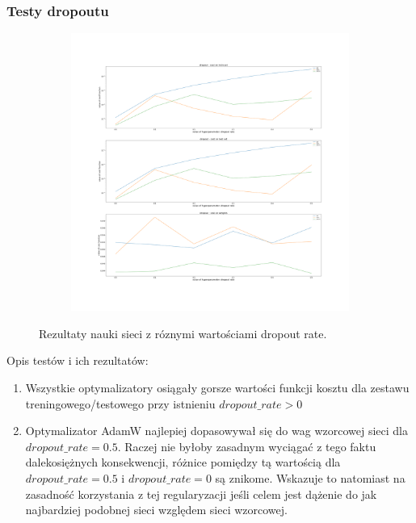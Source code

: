 \documentclass[12pt]{article}
\begin{document}
\subsubsection{Testy dropoutu}
\begin{figure}[H]
	\centering
	\begin{subfigure}[b]{1\linewidth}
		\includegraphics[width=\linewidth]{Comparision_dropout_conv_2.png}
	\end{subfigure}
	\caption{Rezultaty nauki sieci z róznymi wartościami dropout rate.}
	\label{fig:dropout_cnn}
\end{figure}
Opis testów i ich rezultatów:
\begin{enumerate}
	\item Wszystkie optymalizatory osiągały gorsze wartości funkcji kosztu dla zestawu treningowego/testowego przy istnieniu $dropout\_rate>0$
	\item Optymalizator AdamW najlepiej dopasowywał się do wag wzorcowej sieci dla $dropout\_rate=0.5$. Raczej nie byłoby zasadnym wyciągać z tego faktu dalekosiężnych konsekwencji, różnice pomiędzy tą wartością dla $dropout\_rate=0.5$ i $dropout\_rate=0$ są znikome. Wskazuje to natomiast na zasadność korzystania z tej regularyzacji jeśli celem jest dążenie do jak najbardziej podobnej sieci względem sieci wzorcowej.
\end{enumerate}
\end{document}
